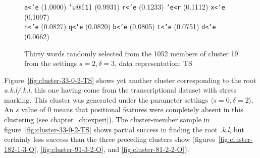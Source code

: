 \begin{figure}[htb]
\begin{mdframed}
\begin{mdframed}
\begin{small}
\begin{tabbing}
\texttt{a<\a'{e}} \> (1.0000) \> \texttt{\a'{u}}@\texttt{[1]} \> (0.9931) \> \texttt{r<\a'{e}} \> (0.1233) \> \texttt{\a'{e}<r} \> (0.1112) \> \texttt{x<\a'{e}} \> (0.1097)\\
\texttt{n<\a'{e}} \> (0.0827) \> \texttt{q<\a'{e}} \> (0.0820) \> \texttt{b<\a'{e}} \> (0.0805) \> \texttt{t<\a'{e}} \> (0.0751) \> \texttt{d<\a'{e}} \> (0.0662)
\end{tabbing}
\end{small}
\end{mdframed}
\vspace{-3pt}
\caption{Thirty words randomly selected from the 1052 members of cluster 19 from the settings $s=2,\delta =3$, data representation: TS}
\label{fig:cluster-19-2-3-TS}
\end{mdframed}
\end{figure}
Figure~\ref{fig:cluster-33-0-2-TS} shows yet another cluster corresponding to the root \textit{a.k.l/}\textit{.k.l}, this one
having come from the transcriptional dataset with stress marking. This cluster was generated under the parameter settings $\langle s=0, \delta=2 \rangle$. An $s$ value of 0 means that positional features were completely absent in this clustering (see chapter~\ref{ch:experi}).
The cluster-member sample in figure~\ref{fig:cluster-33-0-2-TS} shows partial success in finding the root 
\textit{.k.l}, but certainly less success than the three preceding clusters show
(figures~\ref{fig:cluster-182-1-3-O}, \ref{fig:cluster-91-3-2-O},
and \ref{fig:cluster-81-2-2-O}). 

